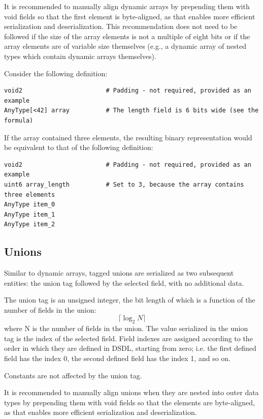 It is recommended to manually align dynamic arrays by prepending them with void fields
so that the first element is byte-aligned, as that enables more efficient serialization and
deserialization.
This recommendation does not need to be followed if the size of the array elements is not
a multiple of eight bits or if the array elements are of variable size themselves
(e.g., a dynamic array of nested types which contain dynamic arrays themselves).

Consider the following definition:

\begin{verbatim}
void2                       # Padding - not required, provided as an example
AnyType[<42] array          # The length field is 6 bits wide (see the formula)
\end{verbatim}

If the array contained three elements,
the resulting binary representation would be equivalent to that of the following definition:

\begin{verbatim}
void2                       # Padding - not required, provided as an example
uint6 array_length          # Set to 3, because the array contains three elements
AnyType item_0
AnyType item_1
AnyType item_2
\end{verbatim}

\subsection{Unions}

Similar to dynamic arrays, tagged unions are serialized as two subsequent entities:
the union tag followed by the selected field, with no additional data.

The union tag is an unsigned integer, the bit length of which is a function of the number of fields in the union:
$$\lceil{}\log_2 N\rceil{}$$
where N is the number of fields in the union.
The value serialized in the union tag is the index of the selected field.
Field indexes are assigned according to the order in which they are defined in DSDL,
starting from zero;
i.e. the first defined field has the index 0, the second defined field has the index 1, and so on.

Constants are not affected by the union tag.

It is recommended to manually align unions when they are nested into outer data types by
prepending them with void fields so that the elements are byte-aligned,
as that enables more efficient serialization and deserialization.

